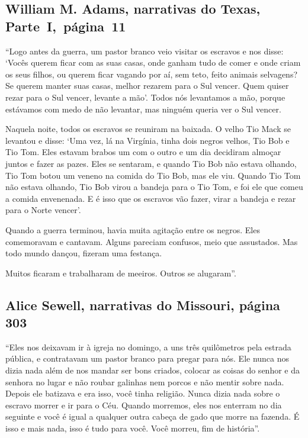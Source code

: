 \subsection{William M. Adams, narrativas do Texas, Parte~I,~página~11} \label{ref04}

``Logo antes da guerra, um pastor branco veio visitar os escravos e nos
disse: `Vocês querem ficar com as suas casas, onde ganham tudo de comer
e onde criam os seus filhos, ou querem ficar vagando por aí, sem teto,
feito animais selvagens? Se querem manter suas casas, melhor rezarem
para o Sul vencer. Quem quiser rezar para o Sul vencer, levante a mão'.
Todos nós levantamos a mão, porque estávamos com medo de não levantar,
mas ninguém queria ver o Sul vencer.

Naquela noite, todos os escravos se reuniram na baixada. O velho Tio
Mack se levantou e disse: `Uma vez, lá na Virgínia, tinha dois negros
velhos, Tio Bob e Tio Tom. Eles estavam brabos um com o outro e um dia
decidiram almoçar juntos e fazer as pazes. Eles se sentaram, e quando
Tio Bob não estava olhando, Tio Tom botou um veneno na comida do Tio
Bob, mas ele viu. Quando Tio Tom não estava olhando, Tio Bob virou a
bandeja para o Tio Tom, e foi ele que comeu a comida envenenada. E é
isso que os escravos vão fazer, virar a bandeja e rezar para o Norte
vencer'.

Quando a guerra terminou, havia muita agitação entre os negros. Eles
comemoravam e cantavam. Alguns pareciam confusos, meio que assustados.
Mas todo mundo dançou, fizeram uma festança.

Muitos ficaram e trabalharam de meeiros. Outros se alugaram''.

\subsection{Alice Sewell, narrativas do Missouri, página 303}
\label{ref236}

``Eles nos deixavam ir à igreja no domingo, a uns três quilômetros pela
estrada pública, e contratavam um pastor branco para pregar para nós.
Ele nunca nos dizia nada além de nos mandar ser bons criados, colocar as
coisas do senhor e da senhora no lugar e não roubar galinhas nem porcos
e não mentir sobre nada. Depois ele batizava e era isso, você tinha
religião. Nunca dizia nada sobre o escravo morrer e ir para o Céu.
Quando morremos, eles nos enterram no dia seguinte e você é igual a
qualquer outra cabeça de gado que morre na fazenda. É isso e mais nada,
isso é tudo para você. Você morreu, fim de história''.

